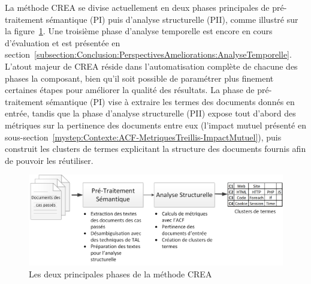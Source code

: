 
La méthode CREA se divise actuellement en deux phases principales de pré-traitement sémantique (PI) puis d'analyse structurelle (PII), comme illustré sur la figure~\ref{figure:3-MethodeGenerale}.
Une troisième phase d'analyse temporelle est encore en cours d'évaluation et est présentée en section~\ref{subsection:Conclusion:PerspectivesAmeliorations:AnalyseTemporelle}.
L'atout majeur de CREA réside dans l'automatisation complète de chacune des phases la composant, bien qu'il soit possible de paramétrer plus finement certaines étapes pour améliorer la qualité des résultats.
La phase de pré-traitement sémantique (PI) vise à extraire les termes des documents donnés en entrée, tandis que la phase d'analyse structurelle (PII) expose tout d'abord des métriques sur la pertinence des documents entre eux (l'impact mutuel présenté en sous-section~\ref{mystep:Contexte:ACF-MetriquesTreillis-ImpactMutuel}), puis construit les clusters de termes explicitant la structure des documents fournis afin de pouvoir les réutiliser.


\begin{figure}[ht]
\centering
\centerline{  %
\includegraphics[scale=0.7]{3-Methode-CREA/images/schema_general.png}
}
\caption{Les deux principales phases de la méthode CREA}
\label{figure:3-MethodeGenerale}
\end{figure}

\bigskip

